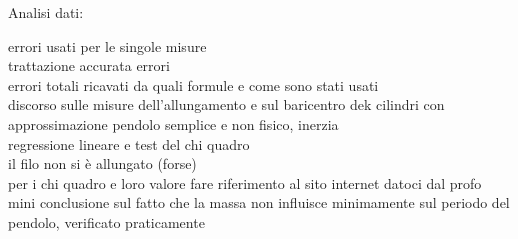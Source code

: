 Analisi dati:

errori usati per le singole misure\\
trattazione accurata errori\\
errori totali ricavati da quali formule e come sono stati usati\\
discorso sulle misure dell'allungamento e sul baricentro dek cilindri con approssimazione pendolo semplice e non fisico, inerzia\\
regressione lineare e test del chi quadro\\
il filo non si è allungato (forse)\\
per i chi quadro e loro valore fare riferimento al sito internet datoci dal profo\\
mini conclusione sul fatto che la massa non influisce minimamente sul periodo del pendolo, verificato praticamente\\

